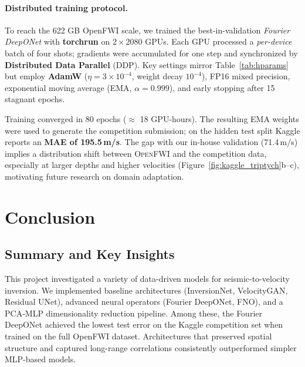\documentclass{article}
\newcommand{\instructions}[1]{{\color{blue} #1}}
\begin{document}
\paragraph{Distributed training protocol.} To reach the 622 GB OpenFWI scale, we trained the best-in-validation \emph{Fourier DeepONet} with \textbf{torchrun} on $2 \times 2080$ GPUs.  
Each GPU processed a \textit{per-device} batch of four shots; gradients were accumulated for one step and synchronized by \textbf{Distributed Data Parallel} (DDP).  Key settings mirror Table~\ref{tab:hparams} but employ \textbf{AdamW} ($\eta =3\times10^{-4}$, weight decay $10^{-4}$), FP16 mixed precision, exponential moving average (EMA, $\alpha=0.999$), and early stopping after 15 stagnant epochs.  

Training converged in $80$ epochs (\(\approx\) 18 GPU-hours).  
The resulting EMA weights were used to generate the competition submission; on the hidden test split Kaggle reports an \textbf{MAE of 195.5\,m/s}.  
The gap with our in-house validation (71.4\,m/s) implies a distribution shift between \textsc{OpenFWI} and the competition data, especially at larger depths and higher velocities (Figure~\ref{fig:kaggle_triptych}b–c), motivating future research on domain adaptation.

\section{Conclusion}

\subsection{Summary and Key Insights}

This project investigated a variety of data-driven models for seismic-to-velocity inversion. We implemented baseline architectures (InversionNet, VelocityGAN, Residual UNet), advanced neural operators (Fourier DeepONet, FNO), and a PCA-MLP dimensionality reduction pipeline. Among these, the Fourier DeepONet achieved the lowest test error on the Kaggle competition set when trained on the full OpenFWI dataset. Architectures that preserved spatial structure and captured long-range correlations consistently outperformed simpler MLP-based models.
\end{document}
